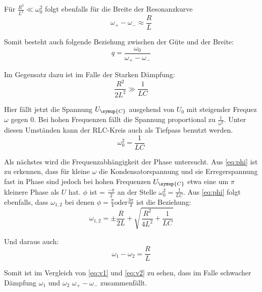     \noindent Für $\frac{R^2}{L^2} \ll {\omega}^2_0$ folgt ebenfalls für die Breite der Resonanzkurve
    \begin{equation}
        \omega_+ - \omega_- \approx \frac{R}{L} 
        \label{eq:v1}
    \end{equation}

    \noindent Somit besteht auch folgende Beziehung zwischen der Güte und der Breite:
    \begin{equation}
        q = \frac{\omega_0}{\omega_+ - \omega_-} \nonumber
    \end{equation}

    \noindent Im Gegensatz dazu ist im Falle der Starken Dämpfung:
    \begin{equation}
        \frac{R^2}{2L^2} \gg \frac{1}{LC} \nonumber
    \end{equation}

    \noindent Hier fällt jetzt die Spannung $U_{\symup{C}}$ ausgehend von $U_0$ mit steigender Frequez $\omega$ gegen 0. Bei hohen Frequenzen fällt
    die Spannung proportional zu $\frac{1}{\omega^2}$. Unter diesen Umständen kann der RLC-Kreis auch als Tiefpass benutzt werden.
    \begin{equation}
        \omega^2_0 = \frac{1}{LC} \nonumber
    \end{equation}

    \noindent Als nächstes wird die Frequenzabhängigkeit der Phase untersucht. Aus \ref{eq:phi} ist zu erkennen, dass für kleine $\omega$ die 
    Kondensatorspannung und sie Erregerspannung fast in Phase sind jedoch bei hohen Frequenzen $U_{\symup{C}}$ etwa eine um $\pi$ 
    kleinere Phase als $U$ hat. $\phi$ ist = $\frac{-\pi}{2}$ an der Stelle $\omega^2_0 = \frac{1}{LC}$.
    Aus \ref{eq:phi} folgt ebenfalls, dass $\omega_{1,2}$ bei denen $\phi= \frac{\pi}{4} \text{oder} \frac{3\pi}{4}$ ist die Beziehung:
    \begin{equation}
        \omega_{1,2} = \pm  \frac{R}{2L} + \sqrt{\frac{R^2}{4L^2}+ \frac{1}{LC}} \nonumber
    \end{equation}

    \noindent Und daraus auch:
    \begin{equation}
        \omega_1 - \omega_2 = \frac{R}{L} 
        \label{eq:v2}
    \end{equation}

    \noindent Somit ist im Vergleich von \ref{eq:v1} und \ref{eq:v2} zu sehen, dass im Falle schwacher Dämpfung $\omega_1$ und $\omega_2$ 
    $\omega_+ - \omega_-$ zusammenfällt.

